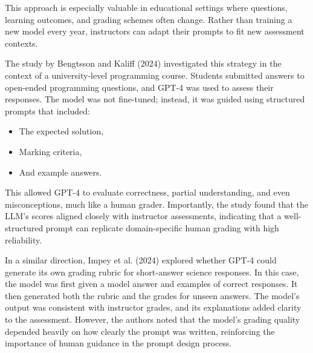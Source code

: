 \documentclass[a4paper,twoside,12pt]{report}
\begin{document}
This approach is especially valuable in educational settings where questions, learning outcomes, and grading schemes often change. Rather than training a new model every year, instructors can adapt their prompts to fit new assessment contexts.

The study by Bengtsson and Kaliff (2024) investigated this strategy in the context of a university-level programming course. Students submitted answers to open-ended programming questions, and GPT-4 was used to assess their responses. The model was not fine-tuned; instead, it was guided using structured prompts that included:
\begin{itemize}
  \item The expected solution,

  \item Marking criteria,

  \item And example answers.

\end{itemize}

This allowed GPT-4 to evaluate correctness, partial understanding, and even misconceptions, much like a human grader. Importantly, the study found that the LLM’s scores aligned closely with instructor assessments, indicating that a well-structured prompt can replicate domain-specific human grading with high reliability.

In a similar direction, Impey et al. (2024) explored whether GPT-4 could generate its own grading rubric for short-answer science responses. In this case, the model was first given a model answer and examples of correct responses. It then generated both the rubric and the grades for unseen answers. The model’s output was consistent with instructor grades, and its explanations added clarity to the assessment. However, the authors noted that the model’s grading quality depended heavily on how clearly the prompt was written, reinforcing the importance of human guidance in the prompt design process.
\end{document}
